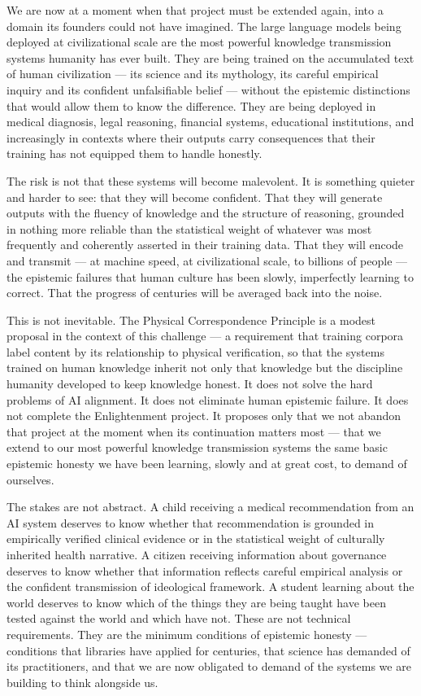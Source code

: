 \documentclass[12pt]{article}
\begin{document}
We are now at a moment when that project must be extended again, into a
domain its founders could not have imagined. The large language models
being deployed at civilizational scale are the most powerful knowledge
transmission systems humanity has ever built. They are being trained on
the accumulated text of human civilization --- its science and its
mythology, its careful empirical inquiry and its confident unfalsifiable
belief --- without the epistemic distinctions that would allow them to
know the difference. They are being deployed in medical diagnosis, legal
reasoning, financial systems, educational institutions, and increasingly
in contexts where their outputs carry consequences that their training
has not equipped them to handle honestly.

The risk is not that these systems will become malevolent. It is
something quieter and harder to see: that they will become confident.
That they will generate outputs with the fluency of knowledge and the
structure of reasoning, grounded in nothing more reliable than the
statistical weight of whatever was most frequently and coherently
asserted in their training data. That they will encode and transmit ---
at machine speed, at civilizational scale, to billions of people --- the
epistemic failures that human culture has been slowly, imperfectly
learning to correct. That the progress of centuries will be averaged
back into the noise.

This is not inevitable. The Physical Correspondence Principle is a
modest proposal in the context of this challenge --- a requirement that
training corpora label content by its relationship to physical
verification, so that the systems trained on human knowledge inherit not
only that knowledge but the discipline humanity developed to keep
knowledge honest. It does not solve the hard problems of AI alignment.
It does not eliminate human epistemic failure. It does not complete the
Enlightenment project. It proposes only that we not abandon that project
at the moment when its continuation matters most --- that we extend to
our most powerful knowledge transmission systems the same basic
epistemic honesty we have been learning, slowly and at great cost, to
demand of ourselves.

The stakes are not abstract. A child receiving a medical recommendation
from an AI system deserves to know whether that recommendation is
grounded in empirically verified clinical evidence or in the statistical
weight of culturally inherited health narrative. A citizen receiving
information about governance deserves to know whether that information
reflects careful empirical analysis or the confident transmission of
ideological framework. A student learning about the world deserves to
know which of the things they are being taught have been tested against
the world and which have not. These are not technical requirements. They
are the minimum conditions of epistemic honesty --- conditions that
libraries have applied for centuries, that science has demanded of its
practitioners, and that we are now obligated to demand of the systems we
are building to think alongside us.
\end{document}
